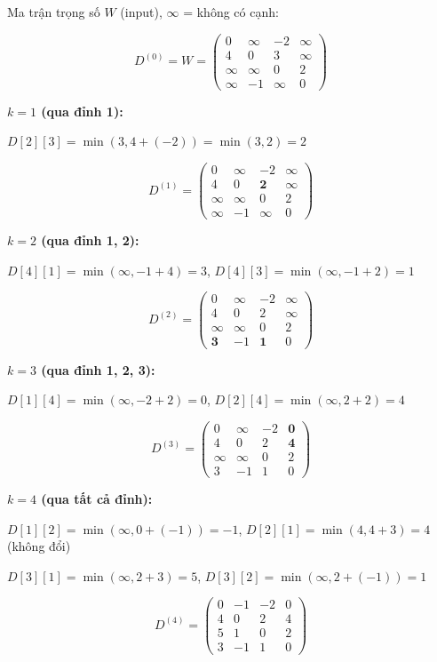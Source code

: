\documentclass[10pt]{article}
\begin{document}
Ma trận trọng số $W$ (input), $\infty$ = không có cạnh:

$$D^{(0)} = W = \begin{pmatrix} 0 & \infty & -2 & \infty \\ 4 & 0 & 3 & \infty \\ \infty & \infty & 0 & 2 \\ \infty & -1 & \infty & 0 \end{pmatrix}$$

\textbf{$k = 1$ (qua đỉnh 1):}

$D[2][3] = \min(3, 4+(-2)) = \min(3, 2) = 2$

$$D^{(1)} = \begin{pmatrix} 0 & \infty & -2 & \infty \\ 4 & 0 & \mathbf{2} & \infty \\ \infty & \infty & 0 & 2 \\ \infty & -1 & \infty & 0 \end{pmatrix}$$

\textbf{$k = 2$ (qua đỉnh 1, 2):}

$D[4][1] = \min(\infty, {-1}+4) = 3$, \quad $D[4][3] = \min(\infty, {-1}+2) = 1$

$$D^{(2)} = \begin{pmatrix} 0 & \infty & -2 & \infty \\ 4 & 0 & 2 & \infty \\ \infty & \infty & 0 & 2 \\ \mathbf{3} & -1 & \mathbf{1} & 0 \end{pmatrix}$$

\textbf{$k = 3$ (qua đỉnh 1, 2, 3):}

$D[1][4] = \min(\infty, {-2}+2) = 0$, \quad $D[2][4] = \min(\infty, 2+2) = 4$

$$D^{(3)} = \begin{pmatrix} 0 & \infty & -2 & \mathbf{0} \\ 4 & 0 & 2 & \mathbf{4} \\ \infty & \infty & 0 & 2 \\ 3 & -1 & 1 & 0 \end{pmatrix}$$

\textbf{$k = 4$ (qua tất cả đỉnh):}

$D[1][2] = \min(\infty, 0+({-1})) = -1$, \quad $D[2][1] = \min(4, 4+3) = 4$ (không đổi)

$D[3][1] = \min(\infty, 2+3) = 5$, \quad $D[3][2] = \min(\infty, 2+({-1})) = 1$

$$\boxed{D^{(4)} = \begin{pmatrix} 0 & -1 & -2 & 0 \\ 4 & 0 & 2 & 4 \\ 5 & 1 & 0 & 2 \\ 3 & -1 & 1 & 0 \end{pmatrix}}$$
\end{document}
